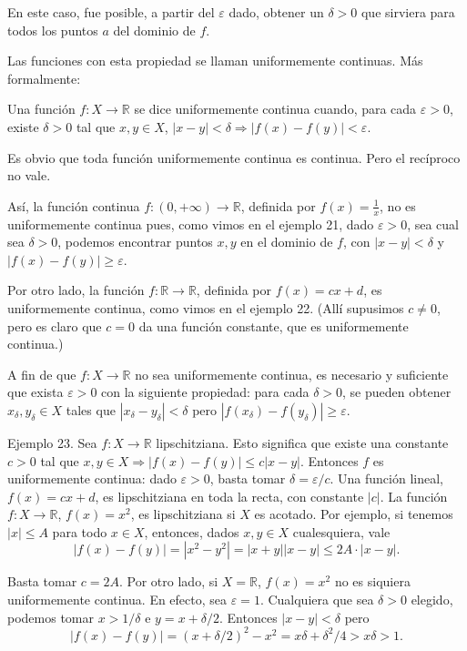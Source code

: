 \documentclass[12pt,oneside]{book}
\begin{document}
En este caso, fue posible, a partir del \( \varepsilon \) dado, obtener un \( \delta > 0 \) que sirviera para todos los puntos \( a \) del dominio de \( f \).

Las funciones con esta propiedad se llaman uniformemente continuas. Más formalmente:

Una función \( f: X \to \mathbb{R} \) se dice uniformemente continua cuando, para cada \( \varepsilon > 0 \), existe \( \delta > 0 \) tal que \( x, y \in X \), \( |x - y| < \delta \Rightarrow |f(x) - f(y)| < \varepsilon \).

Es obvio que toda función uniformemente continua es continua. Pero el recíproco no vale.

Así, la función continua \( f: (0, +\infty) \to \mathbb{R} \), definida por \( f(x) = \frac{1}{x} \), no es uniformemente continua pues, como vimos en el ejemplo 21, dado \(\varepsilon > 0\), sea cual sea \(\delta > 0\), podemos encontrar puntos \(x, y\) en el dominio de \(f\), con \(|x - y| < \delta\) y \(|f(x) - f(y)| \geq \varepsilon\).

Por otro lado, la función \(f: \mathbb{R} \to \mathbb{R}\), definida por \(f(x) = cx + d\), es uniformemente continua, como vimos en el ejemplo 22. (Allí supusimos \(c \neq 0\), pero es claro que \(c = 0\) da una función constante, que es uniformemente continua.)

A fin de que \(f: X \to \mathbb{R}\) no sea uniformemente continua, es necesario y suficiente que exista \(\varepsilon > 0\) con la siguiente propiedad: para cada \(\delta > 0\), se pueden obtener \(x_\delta, y_\delta \in X\) tales que \(|x_\delta - y_\delta| < \delta\) pero \(|f(x_\delta) - f(y_\delta)| \geq \varepsilon\).

Ejemplo 23. Sea \(f: X \to \mathbb{R}\) lipschitziana. Esto significa que existe una constante \(c > 0\) tal que \(x, y \in X \Rightarrow |f(x) - f(y)| \leq c|x - y|\). Entonces \(f\) es uniformemente continua: dado \(\varepsilon > 0\), basta tomar \(\delta = \varepsilon / c\). Una función lineal, \(f(x) = cx + d\), es lipschitziana en toda la recta, con constante \(|c|\). La función \(f: X \to \mathbb{R}\), \(f(x) = x^2\), es lipschitziana si \(X\) es acotado. Por ejemplo, si tenemos \(|x| \leq A\) para todo \(x \in X\), entonces, dados \(x, y \in X\) cualesquiera, vale
\[
|f(x) - f(y)| = |x^2 - y^2| = |x + y||x - y| \leq 2A \cdot |x - y|.
\]

Basta tomar \(c = 2A\). Por otro lado, si \(X = \mathbb{R}\), \(f(x) = x^2\) no es siquiera uniformemente continua. En efecto, sea \(\varepsilon = 1\). Cualquiera que sea \(\delta > 0\) elegido, podemos tomar \(x > 1/\delta\) e \(y = x + \delta/2\). Entonces \(|x - y| < \delta\) pero
\[
|f(x) - f(y)| = (x + \delta/2)^2 - x^2 = x\delta + \delta^2/4 > x\delta > 1.
\]
\end{document}
